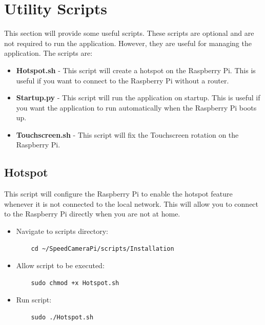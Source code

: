 \chapter{Utility Scripts}

This section will provide some useful scripts. These scripts are optional and are not required to run the application. However, they are useful for managing the application. The scripts are:

\begin{itemize}
      \item \textbf{Hotspot.sh} - This script will create a hotspot on the Raspberry Pi. This is useful if you want to connect to the Raspberry Pi without a router.
      \item \textbf{Startup.py} - This script will run the application on startup. This is useful if you want the application to run automatically when the Raspberry Pi boots up.
      \item \textbf{Touchscreen.sh} - This script will fix the Touchscreen rotation on the Raspberry Pi.
\end{itemize}

\section{Hotspot}

This script will configure the Raspberry Pi to enable the hotspot feature whenever it is not connected to the local network. This will allow you to connect to the Raspberry Pi directly when you are not at home.

\begin{itemize}
      \item Navigate to scripts directory:

            \begin{lstlisting}
    cd ~/SpeedCameraPi/scripts/Installation
    \end{lstlisting}

      \item Allow script to be executed:

            \begin{lstlisting}
    sudo chmod +x Hotspot.sh
    \end{lstlisting}

      \item Run script:

            \begin{lstlisting}
    sudo ./Hotspot.sh
    \end{lstlisting}
\end{itemize}

